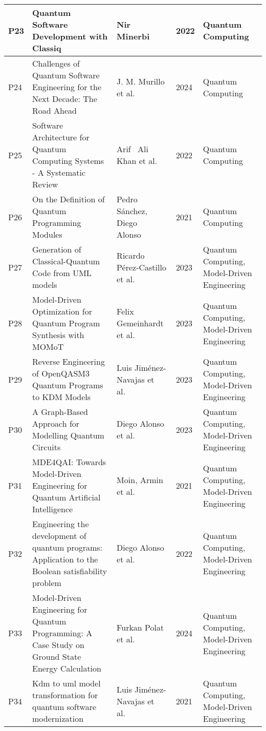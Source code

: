\begin{longtable}{|m{0.8cm}|m{4.4cm}|m{3cm}|m{0.8cm}|m{4cm}|}
    P23 & Quantum Software Development with Classiq & Nir Minerbi~\cite{minerbi2022quantum} & 2022 & Quantum Computing  \\ \hline
    P24 & Challenges of Quantum Software Engineering for the Next Decade: The Road Ahead & J. M. Murillo et al.~\cite{murillo2024challenges} & 2024 & Quantum Computing  \\ \hline
    P25 & Software Architecture for Quantum Computing Systems - A Systematic Review & Arif  Ali Khan et al.~\cite{Khan_2022} & 2022 & Quantum Computing  \\ \hline
    P26 & On the Definition of Quantum Programming Modules & Pedro Sánchez, Diego Alonso~\cite{Sanchez_2021} & 2021 & Quantum Computing  \\ \hline
    P27 & Generation of Classical-Quantum Code from UML models & Ricardo Pérez-Castillo et al.~\cite{Perez-Castillo_2023} & 2023 & Quantum Computing, Model-Driven Engineering  \\ \hline
    P28 & Model-Driven Optimization for Quantum Program Synthesis with MOMoT & Felix Gemeinhardt et al.~\cite{Gemeinhardt_2023} & 2023 & Quantum Computing, Model-Driven Engineering  \\ \hline
    P29 & Reverse Engineering of OpenQASM3 Quantum Programs to KDM Models & Luis Jiménez-Navajas et al.~\cite{Jimenez-Navajas_2023} & 2023 & Quantum Computing, Model-Driven Engineering  \\ \hline
    P30 & A Graph-Based Approach for Modelling Quantum Circuits & Diego Alonso et al.~\cite{alonso2023graph} & 2023 & Quantum Computing, Model-Driven Engineering  \\ \hline
    P31 & MDE4QAI: Towards Model-Driven Engineering for Quantum Artificial Intelligence & Moin, Armin et al.~\cite{Moin_2021} & 2021 & Quantum Computing, Model-Driven Engineering  \\ \hline
    P32 & Engineering the development of quantum programs: Application to the Boolean satisfiability problem & Diego Alonso et al.~\cite{Alonso_2022} & 2022 & Quantum Computing, Model-Driven Engineering  \\ \hline
    P33 & Model-Driven Engineering for Quantum Programming: A Case Study on Ground State Energy Calculation & Furkan Polat et al.~\cite{polat2024model} & 2024 & Quantum Computing, Model-Driven Engineering  \\ \hline
    P34 & Kdm to uml model transformation for quantum software modernization & Luis Jiménez-Navajas et al.~\cite{Jimenez-Navajas_2021} & 2021 & Quantum Computing, Model-Driven Engineering  \\ \hline

\end{longtable}
